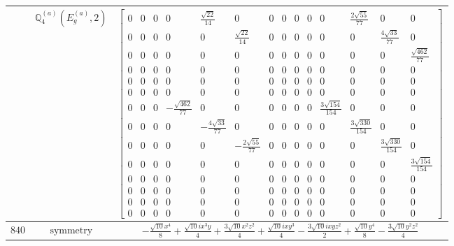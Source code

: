 \documentclass[fleqn,8pt,landscape]{jsarticle}
\begin{document}
\begin{longtable}{ccc}
$  $ & $ \mathbb{Q}_{4}^{(a)}(E_{g}^{(a)},2) $ & $ \begin{bmatrix} 0 & 0 & 0 & 0 & \frac{\sqrt{22}}{14} & 0 & 0 & 0 & 0 & 0 & 0 & \frac{2 \sqrt{55}}{77} & 0 & 0 \\ 0 & 0 & 0 & 0 & 0 & \frac{\sqrt{22}}{14} & 0 & 0 & 0 & 0 & 0 & 0 & \frac{4 \sqrt{33}}{77} & 0 \\ 0 & 0 & 0 & 0 & 0 & 0 & 0 & 0 & 0 & 0 & 0 & 0 & 0 & \frac{\sqrt{462}}{77} \\ 0 & 0 & 0 & 0 & 0 & 0 & 0 & 0 & 0 & 0 & 0 & 0 & 0 & 0 \\ 0 & 0 & 0 & 0 & 0 & 0 & 0 & 0 & 0 & 0 & 0 & 0 & 0 & 0 \\ 0 & 0 & 0 & 0 & 0 & 0 & 0 & 0 & 0 & 0 & 0 & 0 & 0 & 0 \\ 0 & 0 & 0 & - \frac{\sqrt{462}}{77} & 0 & 0 & 0 & 0 & 0 & 0 & \frac{3 \sqrt{154}}{154} & 0 & 0 & 0 \\ 0 & 0 & 0 & 0 & - \frac{4 \sqrt{33}}{77} & 0 & 0 & 0 & 0 & 0 & 0 & \frac{3 \sqrt{330}}{154} & 0 & 0 \\ 0 & 0 & 0 & 0 & 0 & - \frac{2 \sqrt{55}}{77} & 0 & 0 & 0 & 0 & 0 & 0 & \frac{3 \sqrt{330}}{154} & 0 \\ 0 & 0 & 0 & 0 & 0 & 0 & 0 & 0 & 0 & 0 & 0 & 0 & 0 & \frac{3 \sqrt{154}}{154} \\ 0 & 0 & 0 & 0 & 0 & 0 & 0 & 0 & 0 & 0 & 0 & 0 & 0 & 0 \\ 0 & 0 & 0 & 0 & 0 & 0 & 0 & 0 & 0 & 0 & 0 & 0 & 0 & 0 \\ 0 & 0 & 0 & 0 & 0 & 0 & 0 & 0 & 0 & 0 & 0 & 0 & 0 & 0 \\ 0 & 0 & 0 & 0 & 0 & 0 & 0 & 0 & 0 & 0 & 0 & 0 & 0 & 0 \end{bmatrix} $ \\ \hline
$ 840 $ & $ \text{symmetry} $ & $ - \frac{\sqrt{10} x^{4}}{8} + \frac{\sqrt{10} i x^{3} y}{4} + \frac{3 \sqrt{10} x^{2} z^{2}}{4} + \frac{\sqrt{10} i x y^{3}}{4} - \frac{3 \sqrt{10} i x y z^{2}}{2} + \frac{\sqrt{10} y^{4}}{8} - \frac{3 \sqrt{10} y^{2} z^{2}}{4} $ \\

\end{longtable}
\end{document}
